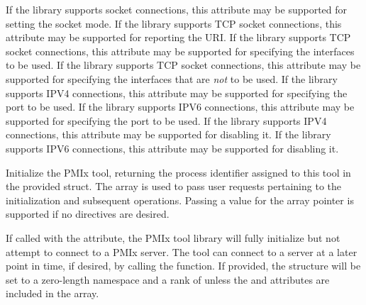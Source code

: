  If the library supports socket connections, this attribute may be supported for setting the socket mode.
\pasteAttributeItemEnd{}
 If the library supports TCP socket connections, this attribute may be supported for reporting the URI.
\pasteAttributeItemEnd{}
 If the library supports TCP socket connections, this attribute may be supported for specifying the interfaces to be used.
\pasteAttributeItemEnd{}
 If the library supports TCP socket connections, this attribute may be supported for specifying the interfaces that are \textit{not} to be used.
\pasteAttributeItemEnd{}
 If the library supports IPV4 connections, this attribute may be supported for specifying the port to be used.
\pasteAttributeItemEnd{}
 If the library supports IPV6 connections, this attribute may be supported for specifying the port to be used.
\pasteAttributeItemEnd{}
 If the library supports IPV4 connections, this attribute may be supported for disabling it.
\pasteAttributeItemEnd{}
 If the library supports IPV6 connections, this attribute may be supported for disabling it.
\pasteAttributeItemEnd{}

\optattrend

\descr

Initialize the \ac{PMIx} tool, returning the process identifier assigned to this tool in the provided  struct. The  array is used to pass user requests pertaining to the initialization and subsequent operations. Passing a  value for the array pointer is supported if no directives are desired.

If called with the  attribute, the \ac{PMIx} tool library will fully initialize but not attempt to connect to a \ac{PMIx} server. The tool can connect to a server at a later point in time, if desired, by calling the  function. If provided, the  structure will be set to a zero-length namespace and a rank of  unless the  and  attributes are included in the  array.

